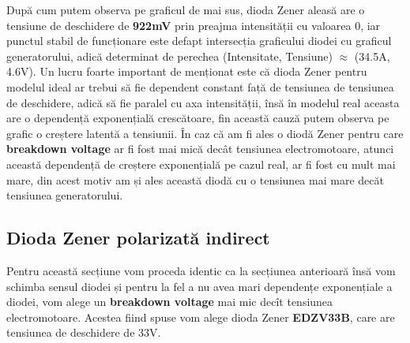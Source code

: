 \documentclass[12pt, a4paper]{article}
\begin{document}
\vspace{2cm}
După cum putem observa pe graficul de mai sus, dioda Zener aleasă are o tensiune de deschidere de \textbf{922mV} prin preajma intensității cu valoarea 0, iar punctul stabil de funcționare este defapt intersecția graficului diodei cu graficul generatorului, adică determinat de perechea (Intensitate, Tensiune) $\approx$ (34.5A, 4.6V). Un lucru foarte important de menționat este că dioda Zener pentru modelul ideal ar trebui să fie dependent constant față de tensiunea de tensiunea de deschidere, adică să fie paralel cu axa intensității, însă în modelul real aceasta are o dependență exponențială crescătoare, fin această cauză putem observa pe grafic o creștere latentă a tensiunii. În caz că am fi ales o diodă Zener pentru care \textbf{breakdown voltage} ar fi fost mai mică decât tensiunea electromotoare, atunci această dependență de creștere exponențială pe cazul real, ar fi fost cu mult mai mare, din acest motiv am și ales această diodă cu o tensiunea mai mare decăt tensiunea generatorului.

\newpage

\subsection{Dioda Zener polarizată indirect}
Pentru această secțiune vom proceda identic ca la secțiunea anterioară însă vom schimba sensul diodei și pentru la fel a nu avea mari dependențe exponențiale a diodei, vom alege un \textbf{breakdown voltage} mai mic decît tensiunea electromotoare. Acestea fiind spuse vom alege dioda Zener \textbf{EDZV33B}, care are tensiunea de deschidere de 33V.

\vspace{3cm}
\end{document}

